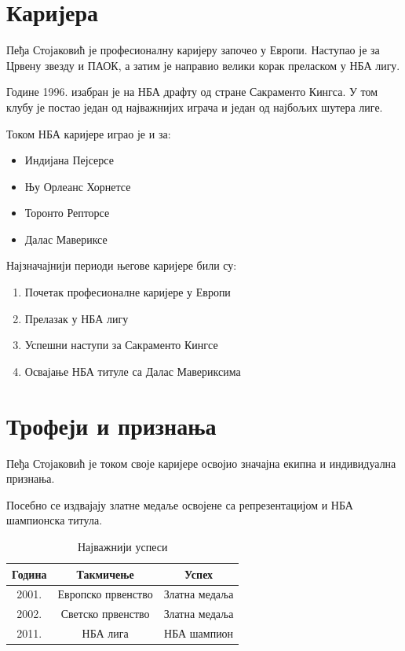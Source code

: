\documentclass[a4paper]{article}
\begin{document}
\section{Каријера}

Пеђа Стојаковић је професионалну каријеру започео у Европи.
Наступао је за Црвену звезду и ПАОК, а затим је направио
велики корак преласком у НБА лигу.

Године 1996. изабран је на НБА драфту од стране
Сакраменто Кингса. У том клубу је постао један од
најважнијих играча и један од најбољих шутера лиге.

Током НБА каријере играо је и за:

\begin{itemize}
    \item Индијана Пејсерсе
    \item Њу Орлеанс Хорнетсе
    \item Торонто Репторсе
    \item Далас Мавериксе
\end{itemize}

Најзначајнији периоди његове каријере били су:

\begin{enumerate}
    \item Почетак професионалне каријере у Европи
    \item Прелазак у НБА лигу
    \item Успешни наступи за Сакраменто Кингсе
    \item Освајање НБА титуле са Далас Мавериксима
\end{enumerate}

\section{Трофеји и признања}

Пеђа Стојаковић је током своје каријере освојио
значајна екипна и индивидуална признања.

Посебно се издвајају златне медаље освојене са
репрезентацијом и НБА шампионска титула.

\begin{table}[H]
\centering
\begin{tabular}{|c|c|c|}
\hline
\textbf{Година} & \textbf{Такмичење} & \textbf{Успех} \\
\hline
2001. & Европско првенство & Златна медаља \\
\hline
2002. & Светско првенство & Златна медаља \\
\hline
2011. & НБА лига & НБА шампион \\
\hline
\end{tabular}
\caption{Најважнији успеси}
\end{table}
\end{document}
